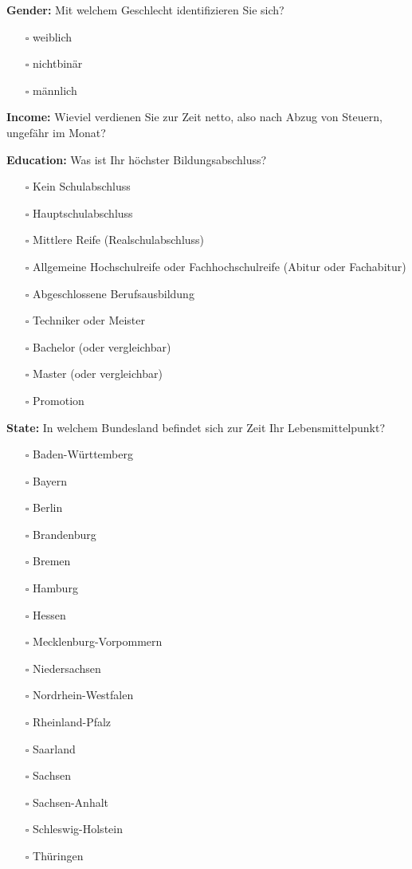 \documentclass[egregdoesnotlikesansseriftitles]{scrartcl}
\begin{document}
\vspace{1em}
\noindent\textbf{Gender:} Mit welchem Geschlecht identifizieren Sie sich?
\begin{itemize}
   \item[$\square$] weiblich
   \item[$\square$] nichtbinär
   \item[$\square$] männlich
\end{itemize}

\vspace{1em}
\noindent\textbf{Income:} Wieviel verdienen Sie zur Zeit netto, also nach Abzug von Steuern, ungefähr im Monat?

\vspace{1em}
\noindent\textbf{Education:} Was ist Ihr höchster Bildungsabschluss?
\begin{itemize}
   \item[$\square$] Kein Schulabschluss
   \item[$\square$] Hauptschulabschluss
   \item[$\square$] Mittlere Reife (Realschulabschluss)
   \item[$\square$] Allgemeine Hochschulreife oder Fachhochschulreife (Abitur oder Fachabitur)
   \item[$\square$] Abgeschlossene Berufsausbildung
   \item[$\square$] Techniker oder Meister
   \item[$\square$] Bachelor (oder vergleichbar)
   \item[$\square$] Master (oder vergleichbar)
   \item[$\square$] Promotion
\end{itemize}

\vspace{1em}
\noindent\textbf{State:} In welchem Bundesland befindet sich zur Zeit Ihr Lebensmittelpunkt?
\begin{itemize}
   \item[$\square$] Baden-Württemberg
   \item[$\square$] Bayern
   \item[$\square$] Berlin
   \item[$\square$] Brandenburg
   \item[$\square$] Bremen
   \item[$\square$] Hamburg
   \item[$\square$] Hessen
   \item[$\square$] Mecklenburg-Vorpommern
   \item[$\square$] Niedersachsen
   \item[$\square$] Nordrhein-Westfalen
   \item[$\square$] Rheinland-Pfalz
   \item[$\square$] Saarland
   \item[$\square$] Sachsen
   \item[$\square$] Sachsen-Anhalt
   \item[$\square$] Schleswig-Holstein
   \item[$\square$] Thüringen
\end{itemize}
\end{document}
